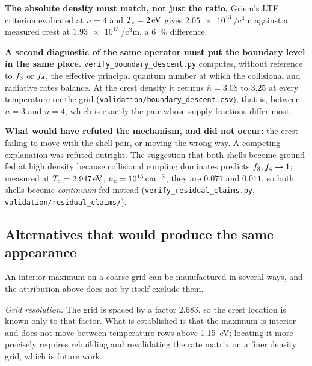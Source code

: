 \textbf{The absolute density must match, not just the ratio.} Griem's LTE
criterion evaluated at $n=4$ and $T_e = \SI{2}{\electronvolt}$ gives
$\SI{2.05e13}{\per\cubic\centi\metre}$ against a measured crest at
$\SI{1.93e13}{\per\cubic\centi\metre}$, a \SI{6}{\percent} difference.

\textbf{A second diagnostic of the same operator must put the boundary level
in the same place.} \texttt{verify\_boundary\_descent.py} computes, without reference to
$f_{3}$ or $f_{4}$, the effective principal quantum number at which the
collisional and radiative rates balance. At the crest density it returns
$\bar n = 3.08$ to $3.25$ at every temperature on the grid
(\texttt{validation/boundary\_descent.csv}), that is, between $n=3$ and $n=4$,
which is exactly the pair whose supply fractions differ most.

\textbf{What would have refuted the mechanism, and did not occur:} the crest
failing to move with the shell pair, or moving the wrong way. A competing
explanation was refuted outright. The suggestion that both shells become
ground-fed at high density because collisional coupling dominates predicts
$f_{3},f_{4}\to1$; measured at $T_e = \SI{2.947}{\electronvolt}$,
$n_e = \SI{e15}{\per\cubic\centi\metre}$, they are $0.071$ and $0.011$, so
both shells become \emph{continuum}-fed instead
(\texttt{verify\_residual\_claims.py}, \texttt{validation/residual\_claims/}).

\subsection{Alternatives that would produce the same appearance}
\label{sec:ridge_alternatives}

An interior maximum on a coarse grid can be manufactured in several ways, and
the attribution above does not by itself exclude them.

\emph{Grid resolution.} The grid is spaced by a factor $2.683$, so the crest
location is known only to that factor. What is established is that the maximum
is interior and does not move between temperature rows above
\SI{1.15}{\electronvolt}; locating it more precisely requires rebuilding and
revalidating the rate matrix on a finer density grid, which is future work.

